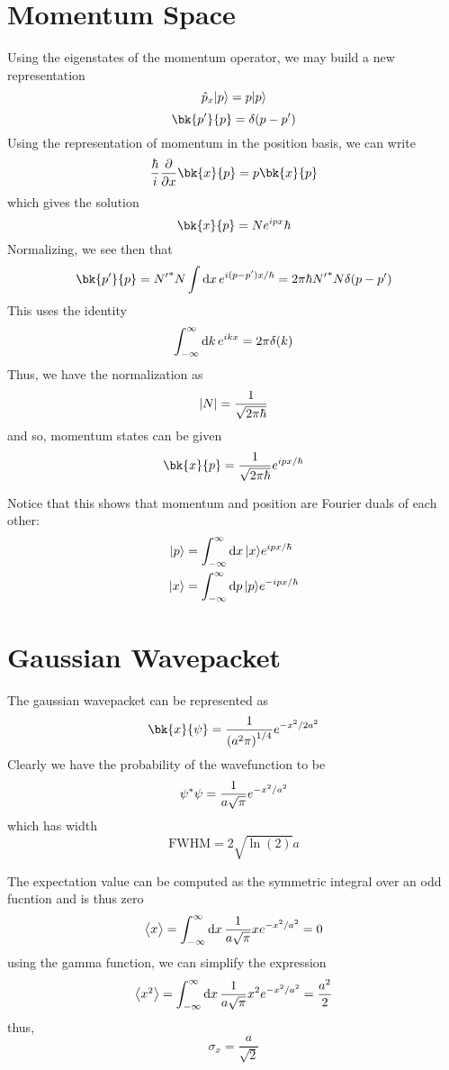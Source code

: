 \section{Momentum Space}
Using the eigenstates of the momentum operator, we may build a new representation
\[\hat p_x\lvert p\rangle=p\lvert p\rangle\]
\[\bk{p'}{p}=\delta(p-p')\]
Using the representation of momentum in the position basis, we can write
\begin{equation}
	\frac{\hbar}{i}\pder{}{x}\bk{x}{p}=p\bk{x}{p}
\end{equation}
which gives the solution
\[\bk{x}{p}=Ne^{ipx}{\hbar}\]
Normalizing, we see then that
\[\bk{p'}{p}={N'} \ast N \int\d{x} e^{i(p-p')x/\hbar}=2\pi\hbar {N'} \ast N\delta(p-p')\]
This uses the identity
\begin{equation}
	\int_{-\infty}^\infty\d{k}e^{ikx}=2\pi \delta (k)
\end{equation}
Thus, we have the normalization as
\[\left|N\right|=\frac{1}{\sqrt{2\pi\hbar}}\]
and so, momentum states can be given
\begin{equation}
	\bk{x}{p}=\frac{1}{\sqrt{2\pi\hbar}}e^{ipx/\hbar}
\end{equation}

Notice that this shows that momentum and position are Fourier duals of each other:
\begin{subequations}
	\begin{align}
		\k{p}&=\int_{-\infty}^\infty\d{x}\k{x}e^{ipx/\hbar}\\
		\k{x}&=\int_{-\infty}^\infty\d{p}\k{p}e^{-ipx/\hbar}
	\end{align}
\end{subequations}

\section{Gaussian Wavepacket}
The gaussian wavepacket can be represented as
\begin{equation}
	\bk{x}{\p}=\frac{1}{\left(a^2\pi\right)^{1/4} }e^{-x^2/2a^2}
\end{equation}
Clearly we have the probability of the wavefunction to be
\[\p\ast\p = \frac{1}{a\sqrt{\pi}}e^{-x^2/a^2}\]
which has width
\[\text{FWHM}=2\sqrt{\ln(2)}a\]

The expectation value can be computed as the symmetric integral over an odd fucntion and is thus zero
\[\vect{x}=\int_{-\infty}^\infty\d{x}\frac{1}{a\sqrt{\pi}}xe^{-x^2/a^2}=0\]
using the gamma function, we can simplify the expression
\[\vect{x^2}=\int_{-\infty}^\infty\d{x}\frac{1}{a\sqrt{\pi}}x^2e^{-x^2/a^2}=\frac{a^2}{2}\]
thus,
\[\sigma_x = \frac{a}{\sqrt{2}}\]

